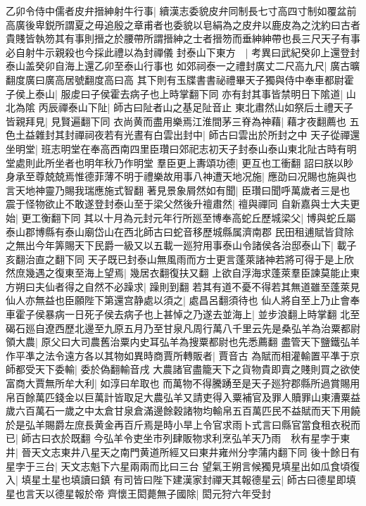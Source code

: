 乙卯令侍中儒者皮弁搢紳射牛行事|{
	續漢志委貌皮弁同制長七寸高四寸制如覆盆前高廣後卑鋭所謂夏之毋追殷之章甫者也委貌以皂絹為之皮弁以鹿皮為之沈約曰古者貴賤皆執笏其有事則搢之於腰帶所謂搢紳之士者搢笏而垂紳紳帶也長三尺天子有事必自射牛示親殺也今採此禮以為封禪儀}
封泰山下東方　|{
	考異曰武紀癸卯上還登封泰山盖癸卯自海上還乙卯至泰山行事也}
如郊祠泰一之禮封廣丈二尺高九尺|{
	廣古曠翻度廣曰廣高居號翻度高曰高}
其下則有玉牒書書祕禮畢天子獨與侍中奉車都尉霍子侯上泰山|{
	服䖍曰子侯霍去病子也上時掌翻下同}
亦有封其事皆禁明日下隂道|{
	山北為隂}
丙辰禪泰山下阯|{
	師古曰阯者山之基足阯音止}
東北肅然山如祭后土禮天子皆親拜見|{
	見賢遍翻下同}
衣尚黄而盡用樂焉江淮間茅三脊為神藉|{
	藉才夜翻薦也}
五色土益雜封其封禪祠夜若有光晝有白雲出封中|{
	師古曰雲出於所封之中}
天子從禪還坐明堂|{
	班志明堂在奉高西南四里臣瓚曰郊祀志初天子封泰山泰山東北阯古時有明堂處則此所坐者也明年秋乃作明堂}
羣臣更上夀頌功德|{
	更互也工衝翻}
詔曰朕以眇身承至尊兢兢焉惟德菲薄不明于禮樂故用事八神遭天地况施|{
	應劭曰况賜也施與也言天地神靈乃賜我瑞應施式智翻}
著見景象屑然如有聞|{
	臣瓚曰聞呼萬歲者三是也}
震于怪物欲止不敢遂登封泰山至于梁父然後升䄠肅然|{
	䄠與禪同}
自新嘉與士大夫更始|{
	更工衡翻下同}
其以十月為元封元年行所廵至博奉高蛇丘歷城梁父|{
	博與蛇丘屬泰山郡博縣有泰山廟岱山在西北師古曰蛇音移歷城縣属濟南郡}
民田租逋賦皆貸除之無出今年筭賜天下民爵一級又以五載一廵狩用事泰山令諸侯各治邸泰山下|{
	載子亥翻治直之翻下同}
天子既已封泰山無風雨而方士更言蓬萊諸神若將可得于是上欣然庶幾遇之復東至海上望焉|{
	幾居衣翻復扶又翻}
上欲自浮海求蓬萊羣臣諫莫能止東方朔曰夫仙者得之自然不必躁求|{
	躁則到翻}
若其有道不憂不得若其無道雖至蓬萊見仙人亦無益也臣願陛下第還宫静處以須之|{
	處昌呂翻須待也}
仙人將自至上乃止會奉車霍子侯暴病一日死子侯去病子也上甚悼之乃遂去並海上|{
	並步浪翻上時掌翻}
北至碣石廵自遼西歷北邊至九原五月乃至甘泉凡周行萬八千里云先是桑弘羊為治粟都尉領大農|{
	原父曰大司農舊治粟内史耳弘羊為搜粟都尉也先悉薦翻}
盡管天下鹽鐵弘羊作平凖之法令遠方各以其物如異時商賈所轉販者|{
	賈音古}
為賦而相灌輸置平凖于京師都受天下委輸|{
	委於偽翻輸音戌}
大農諸官盡籠天下之貨物貴即賣之賤則買之欲使富商大賈無所牟大利|{
	如淳曰牟取也}
而萬物不得騰踴至是天子廵狩郡縣所過賞賜用帛百餘萬匹錢金以巨萬計皆取足大農弘羊又請吏得入粟補官及罪人贖罪山東漕粟益歲六百萬石一歲之中太倉甘泉倉滿邊餘穀諸物均輸帛五百萬匹民不益賦而天下用饒於是弘羊賜爵左庶長黄金再百斤焉是時小旱上令官求雨卜式言曰縣官當食租衣税而已|{
	師古曰衣於既翻}
今弘羊令吏坐市列肆販物求利烹弘羊天乃雨　秋有星孛于東井|{
	晉天文志東井八星天之南門黄道所經又曰東井雍州分孛蒲内翻下同}
後十餘日有星孛于三台|{
	天文志魁下六星兩兩而比曰三台}
望氣王朔言候獨見填星出如瓜食頃復入|{
	填星土星也填讀曰鎮}
有司皆曰陛下建漢家封禪天其報德星云|{
	師古曰德星即填星也言天以德星報於帝}
齊懷王閎薨無子國除|{
	閎元狩六年受封}


